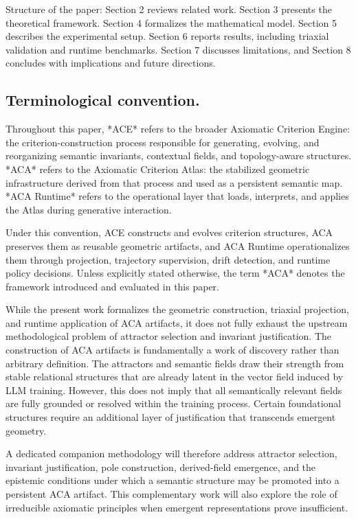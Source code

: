 \documentclass[11pt]{article}
\begin{document}
Structure of the paper: Section 2 reviews related work. Section 3 presents the theoretical framework. Section 4 formalizes the mathematical model. Section 5 describes the experimental setup. Section 6 reports results, including triaxial validation and runtime benchmarks. Section 7 discusses limitations, and Section 8 concludes with implications and future directions.

\subsection{Terminological convention.}

Throughout this paper, *ACE* refers to the broader Axiomatic Criterion Engine: the criterion-construction process responsible for generating, evolving, and reorganizing semantic invariants, contextual fields, and topology-aware structures. *ACA* refers to the Axiomatic Criterion Atlas: the stabilized geometric infrastructure derived from that process and used as a persistent semantic map. *ACA Runtime* refers to the operational layer that loads, interprets, and applies the Atlas during generative interaction.

Under this convention, ACE constructs and evolves criterion structures, ACA preserves them as reusable geometric artifacts, and ACA Runtime operationalizes them through projection, trajectory supervision, drift detection, and runtime policy decisions. Unless explicitly stated otherwise, the term *ACA* denotes the framework introduced and evaluated in this paper.

While the present work formalizes the geometric construction, triaxial projection, and runtime application of ACA artifacts, it does not fully exhaust the upstream methodological problem of attractor selection and invariant justification. The construction of ACA artifacts is fundamentally a work of discovery rather than arbitrary definition. The attractors and semantic fields draw their strength from stable relational structures that are already latent in the vector field induced by LLM training. However, this does not imply that all semantically relevant fields are fully grounded or resolved within the training process. Certain foundational structures require an additional layer of justification that transcends emergent geometry.

A dedicated companion methodology will therefore address attractor selection, invariant justification, pole construction, derived-field emergence, and the epistemic conditions under which a semantic structure may be promoted into a persistent ACA artifact. This complementary work will also explore the role of irreducible axiomatic principles when emergent representations prove insufficient.
\end{document}
